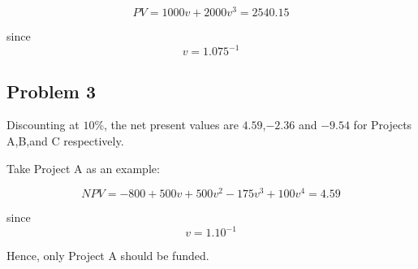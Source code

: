 \documentclass[
]{book}
\begin{document}
\[PV=1000v+2000v^{3}=2540.15 \]

since \[v=1.075^{-1}\]

\hypertarget{problem-3-1}{%
\subsection*{Problem 3}\label{problem-3-1}}

Discounting at \(10\%\), the net present values are \(4.59\),\(-2.36\) and \(-9.54\) for Projects A,B,and C respectively.

Take Project A as an example:

\[NPV=-800+500v+500v^{2}-175v^{3}+100v^{4}=4.59\]

since \[v=1.10^{-1}\]

Hence, only Project A should be funded.

  
\end{document}
